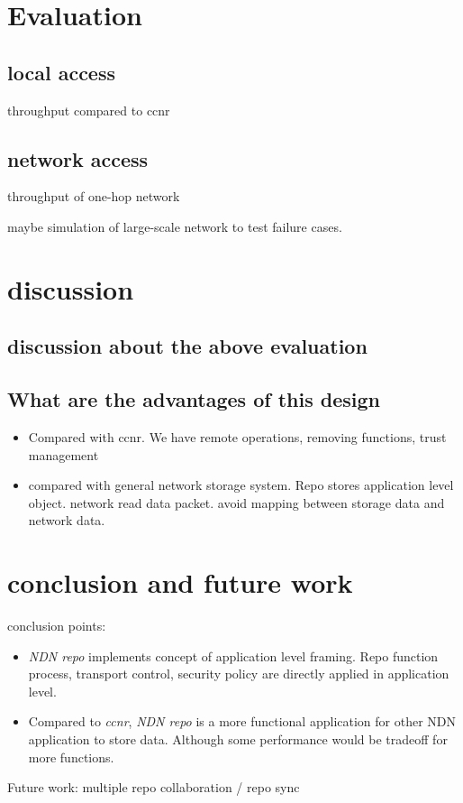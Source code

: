 \documentclass[conference]{IEEEtran}
\begin{document}
\section{Evaluation}

\subsection{local access}
throughput compared to ccnr

\subsection{network access}
throughput of one-hop network

maybe simulation of large-scale network to test failure cases.

\section{discussion}
\subsection{discussion about the above evaluation}

\subsection{What are the advantages of this design}

\begin{itemize}
\item Compared with ccnr. We have remote operations, removing functions, trust management
\item compared with general network storage system. Repo stores application level object. network read data packet. avoid mapping between storage data and network data.
\end{itemize}

\section{conclusion and future work}
conclusion points:
\begin{itemize}
\item \emph{NDN repo} implements concept of application level framing. Repo function process, transport control, security policy are directly applied in application level.
\item Compared to \emph{ccnr}, \emph{NDN repo} is a more functional application for other NDN application to store data. Although some performance would be tradeoff for more functions.
\end{itemize}

Future work: multiple repo collaboration / repo sync



\end{document}
